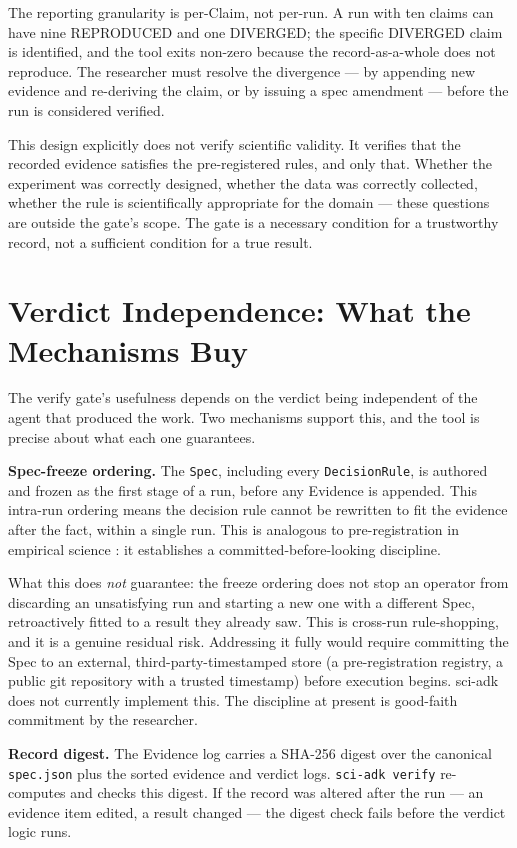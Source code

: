 \documentclass[11pt]{article}
\begin{document}
The reporting granularity is per-Claim, not per-run. A run with ten claims can have nine REPRODUCED and one DIVERGED; the specific DIVERGED claim is identified, and the tool exits non-zero because the record-as-a-whole does not reproduce. The researcher must resolve the divergence --- by appending new evidence and re-deriving the claim, or by issuing a spec amendment --- before the run is considered verified.

This design explicitly does not verify scientific validity. It verifies that the recorded evidence satisfies the pre-registered rules, and only that. Whether the experiment was correctly designed, whether the data was correctly collected, whether the rule is scientifically appropriate for the domain --- these questions are outside the gate's scope. The gate is a necessary condition for a trustworthy record, not a sufficient condition for a true result.

\section{Verdict Independence: What the Mechanisms Buy}

The verify gate's usefulness depends on the verdict being independent of the agent that produced the work. Two mechanisms support this, and the tool is precise about what each one guarantees.

\textbf{Spec-freeze ordering.} The \texttt{Spec}, including every \texttt{DecisionRule}, is authored and frozen as the first stage of a run, before any Evidence is appended. This intra-run ordering means the decision rule cannot be rewritten to fit the evidence after the fact, within a single run. This is analogous to pre-registration in empirical science \citep{prereg}: it establishes a committed-before-looking discipline.

What this does \textit{not} guarantee: the freeze ordering does not stop an operator from discarding an unsatisfying run and starting a new one with a different Spec, retroactively fitted to a result they already saw. This is cross-run rule-shopping, and it is a genuine residual risk. Addressing it fully would require committing the Spec to an external, third-party-timestamped store (a pre-registration registry, a public git repository with a trusted timestamp) before execution begins. sci-adk does not currently implement this. The discipline at present is good-faith commitment by the researcher.

\textbf{Record digest.} The Evidence log carries a SHA-256 digest over the canonical \texttt{spec.json} plus the sorted evidence and verdict logs. \texttt{sci-adk verify} re-computes and checks this digest. If the record was altered after the run --- an evidence item edited, a result changed --- the digest check fails before the verdict logic runs.
\end{document}
